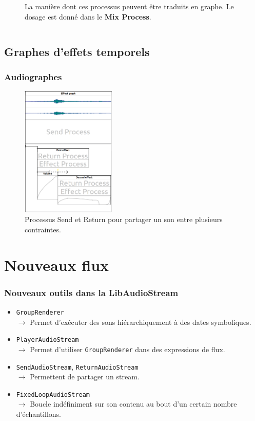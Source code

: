 \documentclass{beamer}
\begin{document}
\begin{frame}
\begin{columns}
\begin{column}{0.5\textwidth}
\begin{figure}
				\caption{La manière dont ces processus peuvent être traduits en graphe. 
					Le dosage est donné dans le \textbf{Mix Process}.}
			\end{figure}
		\end{column}
	\end{columns}
\end{frame}

\subsection{Graphes d'effets temporels}
\begin{frame}
	\frametitle{Audiographes}    
	\Large
	\begin{figure}
		\centering
		\includegraphics[width=0.4\textwidth]{images/ex3.png}
		\caption{Processus Send et Return pour partager un son entre plusieurs contraintes.}
	\end{figure}
\end{frame}

\section{Nouveaux flux}
\begin{frame}[fragile]
	\frametitle{Nouveaux outils dans la LibAudioStream}    
	\Large
	\begin{itemize}
		\item \texttt{GroupRenderer} \\ 
		$\rightarrow$ Permet d'exécuter des sons hiérarchiquement à des dates symboliques.
		\item \texttt{PlayerAudioStream} \\
		$\rightarrow$ Permet d'utiliser \texttt{GroupRenderer} dans des expressions de flux.
		\item \texttt{SendAudioStream}, \texttt{ReturnAudioStream}  \\
		$\rightarrow$ Permettent de partager un stream.
		\item \texttt{FixedLoopAudioStream} \\
		$\rightarrow$ Boucle indéfiniment sur son contenu au bout d'un certain nombre d'échantillons.		
	\end{itemize}    
\end{frame}
\end{document}
